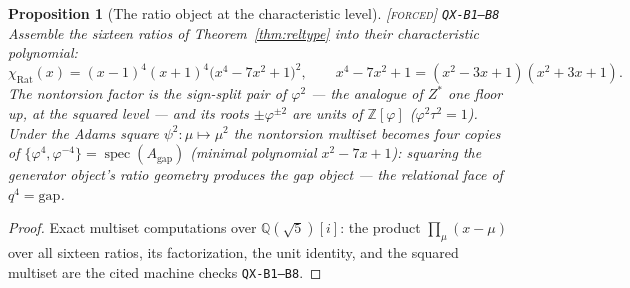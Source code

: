 \documentclass[11pt]{article}
\newcommand{\tagF}{\textcolor{cF}{\textsc{[forced]}}}
\newcommand{\hx}[1]{\textcolor{cC}{\footnotesize\texttt{#1}}}
\newcommand{\Q}{\mathbb{Q}}
\newcommand{\Z}{\mathbb{Z}}
\newcommand{\gp}{\varphi}
\newcommand{\gapc}{\mathrm{gap}}
\theoremstyle{plain}
\newtheorem{proposition}[theorem]{Proposition}
\theoremstyle{definition}
\theoremstyle{remark}
\begin{document}
\begin{proposition}[The ratio object at the characteristic level]\label{prop:chirat}\tagF{} \hx{QX-B1--B8}
Assemble the sixteen ratios of Theorem~\ref{thm:reltype} into their
characteristic polynomial:
\[
\chi_{\mathrm{Rat}}(x)=(x-1)^4(x+1)^4\bigl(x^4-7x^2+1\bigr)^2,
\qquad
x^4-7x^2+1=(x^2-3x+1)(x^2+3x+1).
\]
The nontorsion factor is the sign-split pair of $\gp^2$ --- the analogue of
$Z^{*}$ one floor up, at the squared level --- and its roots
$\pm\gp^{\pm2}$ are units of $\Z[\gp]$ ($\gp^2\tau^2=1$). Under the Adams
square $\psi^2:\mu\mapsto\mu^2$ the nontorsion multiset becomes four copies
of $\{\gp^4,\gp^{-4}\}=\operatorname{spec}(A_{\gapc})$ (minimal polynomial
$x^2-7x+1$): squaring the generator object's ratio geometry produces the
gap object --- the relational face of $q^4=\gapc$.
\end{proposition}

\begin{proof}
Exact multiset computations over $\Q(\sqrt5)[i]$: the product
$\prod_\mu(x-\mu)$ over all sixteen ratios, its factorization, the unit
identity, and the squared multiset are the cited machine checks
\hx{QX-B1--B8}.
\end{proof}
\end{document}
